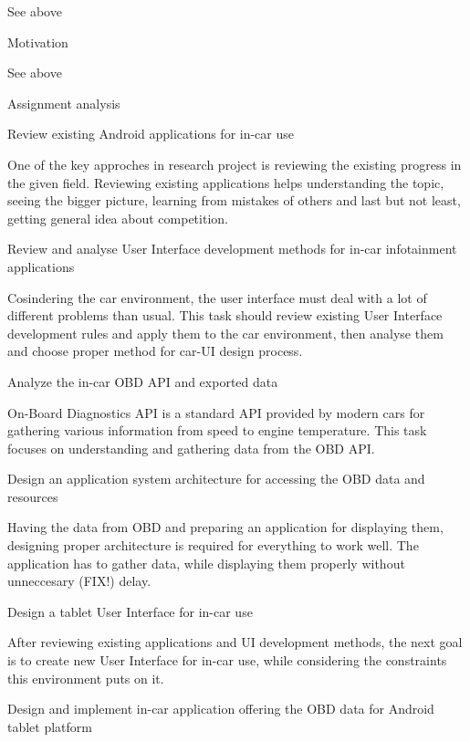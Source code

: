 See above

\secc Motivation

See above

\sec Assignment analysis

\secc Review existing Android applications for in-car use

One of the key approches in research project is reviewing the existing progress in the given field. Reviewing existing applications helps understanding the topic, seeing the bigger picture, learning from mistakes of others and last but not least, getting general idea about competition.

\secc Review and analyse User Interface development methods for in-car infotainment applications

Cosindering the car environment, the user interface must deal with a lot of different problems than usual. This task should review existing User Interface development rules and apply them to the car environment, then analyse them and choose proper method for car-UI design process.

\secc Analyze the in-car OBD API and exported data

On-Board Diagnostics API is a standard API provided by modern cars for gathering various information from speed to engine temperature. This task focuses on understanding and gathering data from the OBD API.

\secc Design an application system architecture for accessing the OBD data and resources

Having the data from OBD and preparing an application for displaying them, designing proper architecture is required for everything to work well. The application has to gather data, while displaying them properly without unneccesary (FIX!) delay.

\secc Design a tablet User Interface for in-car use

After reviewing existing applications and UI development methods, the next goal is to create new User Interface for in-car use, while considering the constraints this environment puts on it.

\secc Design and implement in-car application offering the OBD data for Android tablet platform


